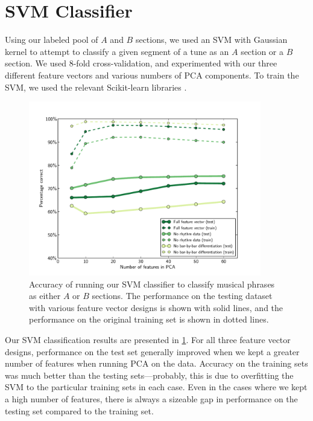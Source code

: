 \documentclass{article} %
\begin{document}
\section{SVM Classifier}
Using our labeled pool of $A$ and $B$ sections, we used an SVM with Gaussian
kernel to attempt to classify a given segment of a tune as an $A$ section or a
$B$ section. We used 8-fold cross-validation, and experimented with our three
different feature vectors and various numbers of PCA components. To train the
SVM, we used the relevant Scikit-learn libraries \cite{sklearn}.


\begin{figure}
  \centering \includegraphics[width=4in]{../svm_results/svm.pdf}
  \caption{
    Accuracy of running our SVM classifier to classify musical phrases as either
    $A$ or $B$ sections. The performance on the testing dataset with various
    feature vector designs is shown with solid lines, and the performance on the
    original training set is shown in dotted lines.
  }
  \label{svmfig}
\end{figure}

Our SVM classification results are presented in \cref{svmfig}. For all three
feature vector designs, performance on the test set generally improved when we
kept a greater number of features when running PCA on the data. Accuracy on
the training sets was much better than the testing sets---probably, this is due
to overfitting the SVM to the particular training sets in each case. Even in the
cases where we kept a high number of features, there is always a sizeable gap in
performance on the testing set compared to the training set.
\end{document}
